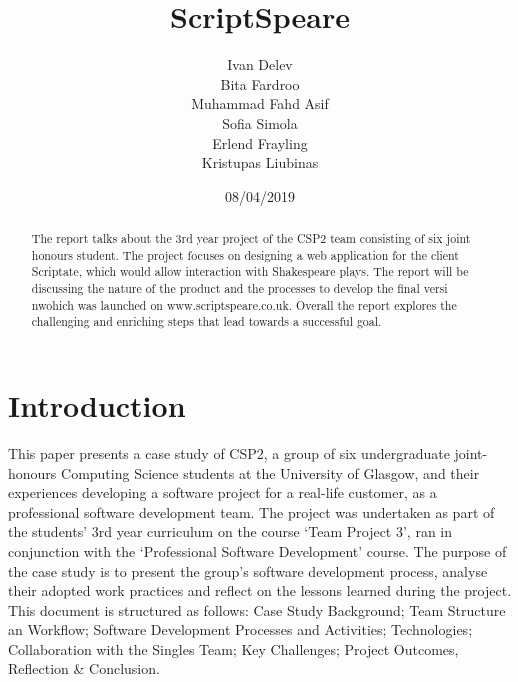 \documentclass{l3proj}
\begin{document}
\title{ ScriptSpeare}

\author{Ivan Delev \\
        Bita Fardroo \\
        Muhammad Fahd Asif \\
        Sofia Simola \\
        Erlend Frayling\\
        Kristupas Liubinas \\}

\date{08/04/2019}

\maketitle

\begin{abstract}

The report talks about the 3rd year project of the CSP2 team consisting of six joint honours student. The project focuses on designing a web application for the client Scriptate, which would allow interaction with Shakespeare plays. The report will be discussing the nature of the product and the processes to develop the final versi nwohich was launched on www.scriptspeare.co.uk. Overall the report explores the challenging and enriching steps that lead towards a successful goal. 


\end{abstract}

\educationalconsent

\newpage

\section{Introduction}

This paper presents a case study of CSP2, a group of six undergraduate joint-honours Computing Science students at the University of Glasgow, and their experiences developing a software project for a real-life customer, as a professional software development team. The project was undertaken as part of the students’ 3rd year curriculum on the course ‘Team Project 3’, ran in conjunction with the ‘Professional Software Development’ course.  The purpose of the case study is to present the group’s software development process, analyse their adopted work practices and reflect on the lessons learned during the project.
 This document is structured as follows: Case Study Background; Team Structure an  Workflow; Software Development Processes and Activities; Technologies; Collaboration with the Singles Team; Key Challenges; Project Outcomes, Reflection \& Conclusion.
\end{document}
